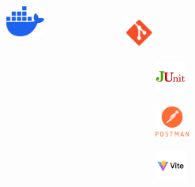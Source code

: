 \begin{frame}{\insertsection}
		\begin{columns}
		\begin{figure}
			\centering
			\label{fig:dockerlogo}
			\includegraphics[height=1cm,keepaspectratio]{../images/DockerLogo}
		\end{figure}
		\begin{figure}
			\centering
			\includegraphics[height=1cm,keepaspectratio]{../images/GitLogo}
			\label{fig:gitlogo}
					\begin{figure}
				\centering
				\label{fig:junitlogo}
				\includegraphics[height=1cm,keepaspectratio]{../images/JUnitLogo}
			\end{figure}
			\begin{figure}
				\centering
				\includegraphics[height=1cm,keepaspectratio]{../images/PostmanLogo}
				\label{fig:postmanlogo}
			\end{figure}
			\begin{figure}
				\centering
				\includegraphics[height=1cm,keepaspectratio]{../images/ViteLogo}
				\label{fig:vitelogo}
			\end{figure}
		\end{figure}
\end{columns}
\end{frame}
